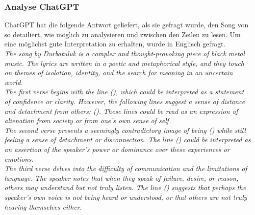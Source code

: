 \documentclass[twocolumn,10pt]{article}
\begin{document}
			\subsubsection{Analyse ChatGPT}
			ChatGPT\cite{ChatGPT} hat die folgende Antwort geliefert, als sie gefragt wurde, den Song  von  so detailiert, wie möglich zu analysieren und zwischen den Zeilen zu lesen. Um eine möglichst gute Interpretation zu erhalten, wurde in Englisch gefragt.\vspace{11pt}\\
			\textit{The song  by Durbatuluk is a complex and thought-provoking piece of black metal music. The lyrics are written in a poetic and metaphorical style, and they touch on themes of isolation, identity, and the search for meaning in an uncertain world.}\vspace{11pt}\\
			\textit{The first verse begins with the line  (), which could be interpreted as a statement of confidence or clarity. However, the following lines suggest a sense of distance and detachment from others:  (). These lines could be read as an expression of alienation from society or from one's own sense of self.}\vspace{11pt}\\
			\textit{The second verse presents a seemingly contradictory image of being  () while still feeling a sense of detachment or disconnection. The line  () could be interpreted as an assertion of the speaker's power or dominance over these experiences or emotions.}\vspace{11pt}\\
			\textit{The third verse delves into the difficulty of communication and the limitations of language. The speaker notes that when they speak of failure, desire, or reason, others may understand but not truly listen. The line  () suggests that perhaps the speaker's own voice is not being heard or understood, or that others are not truly hearing themselves either.}\vspace{11pt}\\
\end{document}
